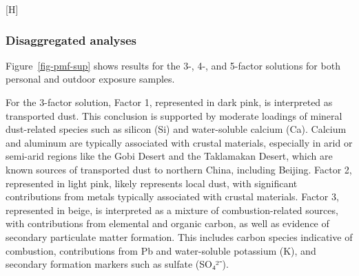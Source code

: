 \documentclass[
  letterpaper,
  DIV=11,
  numbers=noendperiod]{scrartcl}
\makeatletter
\renewenvironment{figure}%
   {\renewcommand\familydefault\sfdefault
    \@float{figure}}
   {\end@float}
\makeatother
\begin{document}
\begin{figure}[H]

\caption{\label{fig-pmf-sup-month}Mass concentrations (ug/m3) of
contributions to PM2.5 mass by each of the four named sources identified
in the source analysis. From left to right, the source contributions
represented are `sulfur secondary', `mixed combustion', `dust', and
`transported dust'. Source contribution mass concentrations are shown by
month (November, December, January) and color-coded by district, with
purple for Fangshan, blue for Huairou, green for Mentougou, and yellow
for Miyun.}


\end{figure}%

\subsubsection{Disaggregated analyses}\label{disaggregated-analyses}

Figure~\ref{fig-pmf-sup} shows results for the 3-, 4-, and 5-factor
solutions for both personal and outdoor exposure samples.

For the 3-factor solution, Factor 1, represented in dark pink, is
interpreted as transported dust. This conclusion is supported by
moderate loadings of mineral dust-related species such as silicon (Si)
and water-soluble calcium (Ca). Calcium and aluminum are typically
associated with crustal materials, especially in arid or semi-arid
regions like the Gobi Desert and the Taklamakan Desert, which are known
sources of transported dust to northern China, including Beijing. Factor
2, represented in light pink, likely represents local dust, with
significant contributions from metals typically associated with crustal
materials. Factor 3, represented in beige, is interpreted as a mixture
of combustion-related sources, with contributions from elemental and
organic carbon, as well as evidence of secondary particulate matter
formation. This includes carbon species indicative of combustion,
contributions from Pb and water-soluble potassium (K), and secondary
formation markers such as sulfate (SO₄²⁻).
\end{document}
